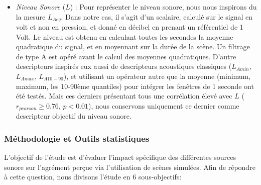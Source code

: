 \begin{itemize}
\begin{itemize}
\item \emph{Niveau Sonore} ($L$) : Pour représenter le niveau sonore, nous nous inspirons du la mesure $L_{Aeq}$. Dans notre cas, il s'agit d'un scalaire, calculé sur le signal en volt et non en pression, et donné en décibel en prenant un référentiel de 1 Volt. Le niveau est obtenu en calculant toutes les secondes la moyenne quadratique du signal, et en moyennant sur la durée de la scène. Un filtrage de type A est opéré avant le calcul des moyennes quadratiques. D'autre descripteurs inspirés eux aussi de descripteurs acoustiques classiques ($L_{Amin}$, $L_{Amax}$, $L_{A10-90}$), et utilisant un opérateur autre que la moyenne (minimum, maximum, les 10-90ème quantiles) pour intégrer les fenêtres de 1 seconde  ont été testés. Mais ces derniers présentant tous une corrélation élevé avec $L$ ($r_{pearson}\geq0.76$, $p<0.01$), nous conservons uniquement ce dernier comme descripteur objectif du niveau sonore.
\end{itemize}
\end{itemize}


\subsubsection{Méthodologie et Outils statistiques}
\label{sec:ch5_methodoEtStat}

L'objectif de l'étude est d'évaluer l'impact spécifique des différentes sources sonore sur l'agrément perçue via l'utilisation de scènes simulées. Afin de répondre à cette question, nous divisons l'étude en 6 sous-objectifs:

